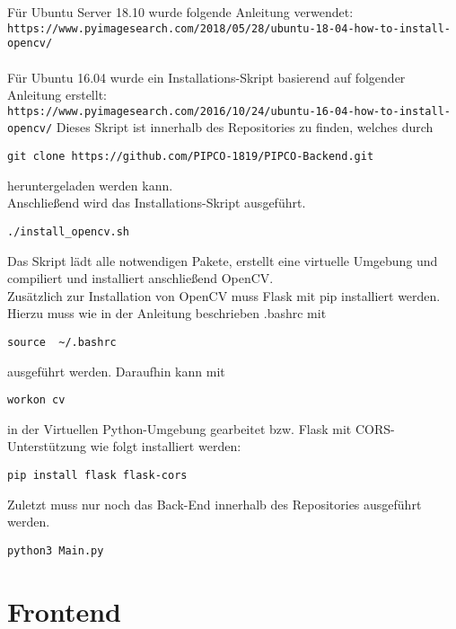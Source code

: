 Für Ubuntu Server 18.10 wurde folgende Anleitung verwendet:\\
\texttt{https://www.pyimagesearch.com/2018/05/28/ubuntu-18-04-how-to-install-opencv/}\\\\
Für Ubuntu 16.04 wurde ein Installations-Skript basierend auf folgender Anleitung erstellt:\\
\texttt{https://www.pyimagesearch.com/2016/10/24/ubuntu-16-04-how-to-install-opencv/}
Dieses Skript ist innerhalb des Repositories zu finden, welches durch
\begin{lstlisting}[frame=single]
git clone https://github.com/PIPCO-1819/PIPCO-Backend.git
\end{lstlisting}
heruntergeladen werden kann.\\
Anschließend wird das Installations-Skript ausgeführt.
\begin{lstlisting}[frame=single]
./install_opencv.sh
\end{lstlisting}
Das Skript lädt alle notwendigen Pakete, erstellt eine virtuelle Umgebung und compiliert und installiert anschließend OpenCV.\\
Zusätzlich zur Installation von OpenCV muss Flask mit pip installiert werden.
Hierzu muss wie in der Anleitung beschrieben .bashrc mit 
\begin{lstlisting}[frame=single]
source  ~/.bashrc
\end{lstlisting}
ausgeführt werden.
Daraufhin kann mit
\begin{lstlisting}[frame=single]
workon cv
\end{lstlisting} in der Virtuellen Python-Umgebung gearbeitet bzw. Flask mit CORS-Unterstützung wie folgt installiert werden:
\begin{lstlisting}[frame=single]
pip install flask flask-cors
\end{lstlisting}
Zuletzt muss nur noch das Back-End innerhalb des Repositories ausgeführt werden.
\begin{lstlisting}[frame=single]
python3 Main.py
\end{lstlisting}

\section{Frontend}
